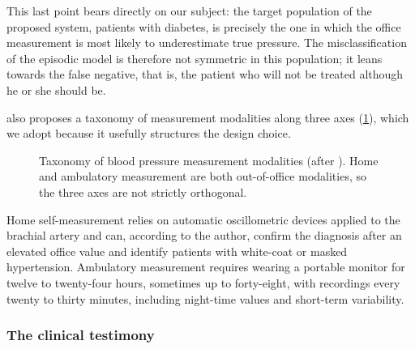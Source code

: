 \documentclass[12pt,a4paper,oneside]{report}
\begin{document}
This last point bears directly on our subject: the target population of the proposed system, patients with diabetes, is precisely the one in which the office measurement is most likely to underestimate true pressure. The misclassification of the episodic model is therefore not symmetric in this population; it leans towards the false negative, that is, the patient who will not be treated although he or she should be.

\textcite{navarro2023} also proposes a taxonomy of measurement modalities along three axes (\cref{fig:taxonomy}), which we adopt because it usefully structures the design choice.

\begin{figure}[htbp]
\centering
{}
\caption{Taxonomy of blood pressure measurement modalities (after \textcite{navarro2023}). Home and ambulatory measurement are both out-of-office modalities, so the three axes are not strictly orthogonal.}\label{fig:taxonomy}
\end{figure}

Home self-measurement relies on automatic oscillometric devices applied to the brachial artery and can, according to the author, confirm the diagnosis after an elevated office value and identify patients with white-coat or masked hypertension. Ambulatory measurement requires wearing a portable monitor for twelve to twenty-four hours, sometimes up to forty-eight, with recordings every twenty to thirty minutes, including night-time values and short-term variability.

\subsubsection{The clinical testimony}\label{sec:testimony}
\end{document}

